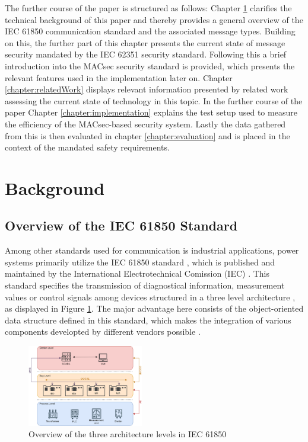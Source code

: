 \documentclass[conference, onecolumn, a4paper]{IEEEtran}
\begin{document}
\smallskip
The further course of the paper is structured as follows: Chapter \ref{chapter:fundamentals} clarifies the technical background of this paper and thereby 
provides a general overview of the IEC 61850 communication standard and the associated  message types. Building on this, the further part of this chapter 
presents the current state of message security mandated by the IEC 62351 security standard. Following this a brief introduction into the MACsec security 
standard is provided, which presents the relevant features used in the implementation later on. Chapter \ref{chapter:relatedWork} displays relevant 
information presented by related work assessing the current state of technology in this topic. In the further course of the paper Chapter 
\ref{chapter:implementation} explains the test setup used to measure the efficiency of the MACsec-based security system. Lastly the data gathered from 
this is then evaluated in chapter \ref{chapter:evaluation} and is placed in the context of the mandated safety requirements. 
\pagebreak
\section{Background}
\label{chapter:fundamentals}

\subsection{Overview of the IEC 61850 Standard}
\label{subchapter:IEC61850}
Among other standards used for communication is industrial applications, power systems primarily utilize the IEC 61850 standard \cite{IEC61850:2023}, 
which is published and maintained by the International Electrotechnical Comission (IEC) \cite{IEC61850_Overview:2006}. This standard specifies the 
transmission of diagnostical information, measurement values or control signals among devices structured in a three level architecture 
\cite{SGRWin_IEC61850Architecture:2021}, as displayed in Figure \ref{image:IEC61850Architecture}. The major advantage here consists of the object-oriented 
data structure defined in this standard, which makes the integration of various components developted by different vendors possible 
\cite[p. 5643]{Review_IEC62351:2019}. 

\begin{figure}[h]
    \centering
    \includegraphics[width=0.45\textwidth]{images/IEC61850_Architecture.png}
    \caption{Overview of the three architecture levels in IEC 61850 \cite{SGRWin_IEC61850Architecture:2021}}
    \label{image:IEC61850Architecture}
\end{figure}
\end{document}
